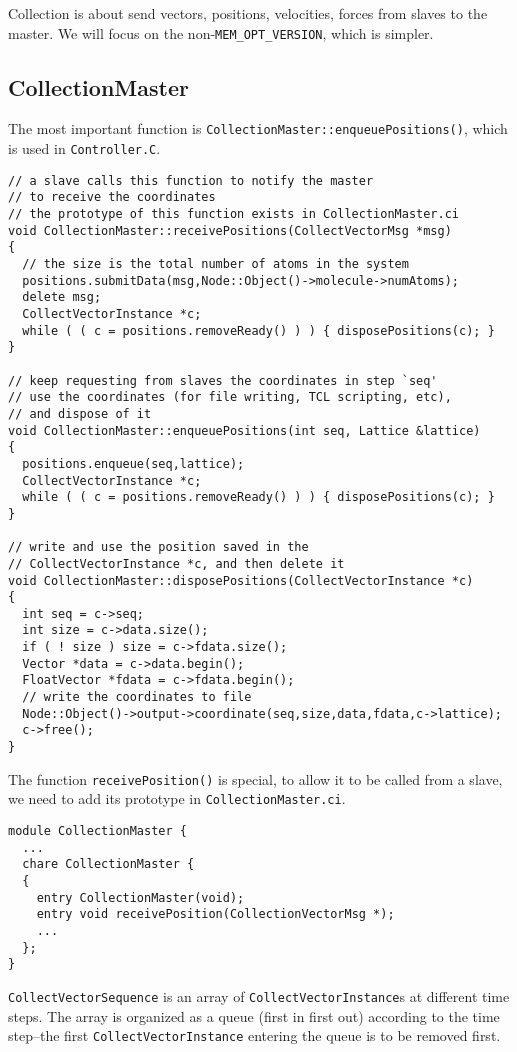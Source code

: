 \documentclass{article}
\begin{document}
Collection is about send vectors, positions, velocities, forces
from slaves to the master.
%
We will focus on the non-\texttt{MEM\_OPT\_VERSION}, which is simpler.

\subsection{CollectionMaster}

The most important function is
\texttt{CollectionMaster::enqueuePositions()},
which is used in \texttt{Controller.C}.

\begin{lstlisting}
// a slave calls this function to notify the master
// to receive the coordinates
// the prototype of this function exists in CollectionMaster.ci
void CollectionMaster::receivePositions(CollectVectorMsg *msg)
{
  // the size is the total number of atoms in the system
  positions.submitData(msg,Node::Object()->molecule->numAtoms);
  delete msg;
  CollectVectorInstance *c;
  while ( ( c = positions.removeReady() ) ) { disposePositions(c); }
}

// keep requesting from slaves the coordinates in step `seq'
// use the coordinates (for file writing, TCL scripting, etc),
// and dispose of it
void CollectionMaster::enqueuePositions(int seq, Lattice &lattice)
{
  positions.enqueue(seq,lattice);
  CollectVectorInstance *c;
  while ( ( c = positions.removeReady() ) ) { disposePositions(c); }
}

// write and use the position saved in the
// CollectVectorInstance *c, and then delete it
void CollectionMaster::disposePositions(CollectVectorInstance *c)
{
  int seq = c->seq;
  int size = c->data.size();
  if ( ! size ) size = c->fdata.size();
  Vector *data = c->data.begin();
  FloatVector *fdata = c->fdata.begin();
  // write the coordinates to file
  Node::Object()->output->coordinate(seq,size,data,fdata,c->lattice);
  c->free();
}
\end{lstlisting}

The function \texttt{receivePosition()} is special,
to allow it to be called from a slave,
we need to add its prototype in \texttt{CollectionMaster.ci}.

\begin{lstlisting}
module CollectionMaster {
  ...
  chare CollectionMaster {
  {
    entry CollectionMaster(void);
    entry void receivePosition(CollectionVectorMsg *);
    ...
  };
}
\end{lstlisting}

\texttt{CollectVectorSequence} is an array
of \texttt{CollectVectorInstance}s at different time steps.
%
The array is organized as a queue (first in first out)
according to the time step--the first \texttt{CollectVectorInstance}
entering the queue is to be removed first.
\end{document}
